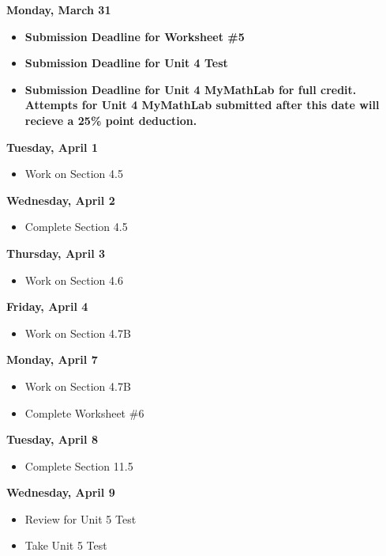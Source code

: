 \documentclass[11pt]{article}
\begin{document}
\textbf{Monday, March 31}

\begin{itemize}
\item \textbf{Submission Deadline for Worksheet \#5}
\item \textbf{Submission Deadline for Unit 4 Test}
\item \textbf{Submission Deadline for Unit 4 MyMathLab for full credit. Attempts for Unit 4 MyMathLab submitted after this date will recieve a 25\% point deduction.}
\end{itemize}

\textbf{Tuesday, April 1}

\begin{itemize}
\item Work on Section 4.5
\end{itemize}

\textbf{Wednesday, April 2}

\begin{itemize}
\item Complete Section 4.5
\end{itemize}

\textbf{Thursday, April 3}

\begin{itemize}
\item Work on Section 4.6
\end{itemize}

\textbf{Friday, April 4}

\begin{itemize}
\item Work on Section 4.7B
\end{itemize}

\textbf{Monday, April 7}

\begin{itemize}
\item Work on Section 4.7B
\item Complete Worksheet \#6
\end{itemize}

\textbf{Tuesday, April 8}

\begin{itemize}
\item Complete Section 11.5
\end{itemize}

\textbf{Wednesday, April 9}

\begin{itemize}
\item Review for Unit 5 Test
\item Take Unit 5 Test
\end{itemize}
\end{document}
